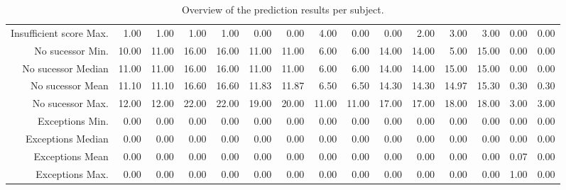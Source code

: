 \begin{table}[ht]
\begin{tabular}{rrrrrrrrrrrrrrr}
  Insufficient score Max. & 1.00 & 1.00 & 1.00 & 1.00 & 0.00 & 0.00 & 4.00 & 0.00 & 0.00 & 2.00 & 3.00 & 3.00 & 0.00 & 0.00 \\ 
  No sucessor Min. & 10.00 & 11.00 & 16.00 & 16.00 & 11.00 & 11.00 & 6.00 & 6.00 & 14.00 & 14.00 & 5.00 & 15.00 & 0.00 & 0.00 \\ 
  No sucessor Median & 11.00 & 11.00 & 16.00 & 16.00 & 11.00 & 11.00 & 6.00 & 6.00 & 14.00 & 14.00 & 15.00 & 15.00 & 0.00 & 0.00 \\ 
  No sucessor Mean & 11.10 & 11.10 & 16.60 & 16.60 & 11.83 & 11.87 & 6.50 & 6.50 & 14.30 & 14.30 & 14.97 & 15.30 & 0.30 & 0.30 \\ 
  No sucessor Max. & 12.00 & 12.00 & 22.00 & 22.00 & 19.00 & 20.00 & 11.00 & 11.00 & 17.00 & 17.00 & 18.00 & 18.00 & 3.00 & 3.00 \\ 
  Exceptions Min. & 0.00 & 0.00 & 0.00 & 0.00 & 0.00 & 0.00 & 0.00 & 0.00 & 0.00 & 0.00 & 0.00 & 0.00 & 0.00 & 0.00 \\ 
  Exceptions Median & 0.00 & 0.00 & 0.00 & 0.00 & 0.00 & 0.00 & 0.00 & 0.00 & 0.00 & 0.00 & 0.00 & 0.00 & 0.00 & 0.00 \\ 
  Exceptions Mean & 0.00 & 0.00 & 0.00 & 0.00 & 0.00 & 0.00 & 0.00 & 0.00 & 0.00 & 0.00 & 0.00 & 0.00 & 0.07 & 0.00 \\ 
  Exceptions Max. & 0.00 & 0.00 & 0.00 & 0.00 & 0.00 & 0.00 & 0.00 & 0.00 & 0.00 & 0.00 & 0.00 & 0.00 & 1.00 & 0.00 \\ 
   \hline
\end{tabular}
\caption{Overview of the prediction results per subject.} 
\label{tab:results:rq4:summary:subject:counts}
\end{table}
